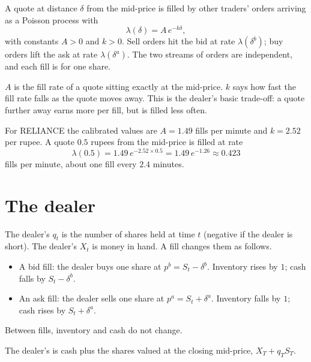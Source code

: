 \begin{definition}
\label{def:fill}
A quote at distance $\delta$ from the mid-price is filled by other traders' orders arriving as a Poisson process with 
\[
  \lambda(\delta)=A\,e^{-k\delta},
\]
with constants $A>0$ and $k>0$. Sell orders hit the bid at rate $\lambda(\delta^b)$; buy orders lift the ask at rate $\lambda(\delta^a)$. The two streams of orders are independent, and each fill is for one share.
\end{definition}

$A$ is the fill rate of a quote sitting exactly at the mid-price. $k$ says how fast the fill rate falls as the quote moves away. This is the dealer's basic trade-off: a quote further away earns more per fill, but is filled less often.

\begin{example}
For RELIANCE the calibrated values are $A=1.49$ fills per minute and $k=2.52$ per rupee. A quote $0.5$ rupees from the mid-price is filled at rate
\[
  \lambda(0.5)=1.49\,e^{-2.52\times0.5}=1.49\,e^{-1.26}\approx0.423
\]
fills per minute, about one fill every $2.4$ minutes.
\end{example}

\section{The dealer}

\begin{definition}
\label{def:inventory}
The dealer's  $q_t$ is the number of shares held at time $t$ (negative if the dealer is short). The dealer's  $X_t$ is money in hand. A fill changes them as follows.
\begin{itemize}
  \item A bid fill: the dealer buys one share at $p^b=S_t-\delta^b$. Inventory rises by $1$; cash falls by $S_t-\delta^b$.
  \item An ask fill: the dealer sells one share at $p^a=S_t+\delta^a$. Inventory falls by $1$; cash rises by $S_t+\delta^a$.
\end{itemize}
Between fills, inventory and cash do not change.
\end{definition}

\begin{definition}
\label{def:wealth}
The dealer's  is cash plus the shares valued at the closing mid-price, $X_T+q_TS_T$.
\end{definition}

